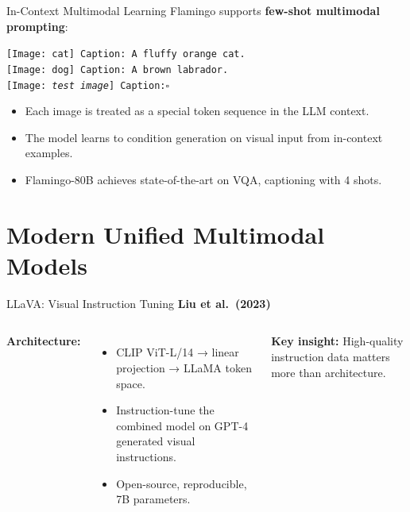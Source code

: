 \documentclass[aspectratio=169,10pt]{beamer}
\begin{document}
\begin{frame}{In-Context Multimodal Learning}
  Flamingo supports \textbf{few-shot multimodal prompting}:
  \begin{tcolorbox}[hitbox]
    \texttt{[Image: cat] Caption: A fluffy orange cat.}\\
    \texttt{[Image: dog] Caption: A brown labrador.}\\
    \texttt{[Image: \textit{test image}] Caption:}$\square$
  \end{tcolorbox}
  \vspace{0.4em}
  \begin{itemize}
    \item Each image is treated as a special token sequence in the LLM context.
    \item The model learns to condition generation on visual input from in-context examples.
    \item Flamingo-80B achieves state-of-the-art on VQA, captioning with 4 shots.
  \end{itemize}
\end{frame}

\section{Modern Unified Multimodal Models}

\begin{frame}{LLaVA: Visual Instruction Tuning}
  \textbf{Liu et al.\ (2023)}~\cite{liu2023llava}
  \vspace{0.4em}
  \begin{columns}[T]
      \textbf{Architecture:}
      \begin{itemize}
        \item CLIP ViT-L/14 → linear projection → LLaMA token space.
        \item Instruction-tune the combined model on GPT-4 generated visual instructions.
        \item Open-source, reproducible, 7B parameters.
      \end{itemize}
      \vspace{0.4em}
      \textbf{Key insight:} High-quality instruction data matters more than architecture.
  \end{columns}
\end{frame}
\end{document}
